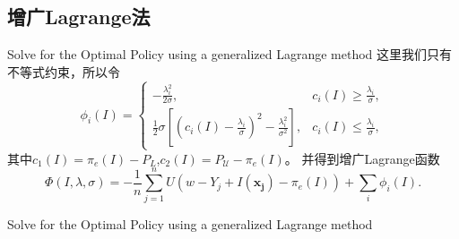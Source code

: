 \documentclass{beamer}
\begin{document}
\subsection{增广Lagrange法}
\begin{frame}{Solve for the Optimal Policy using a generalized Lagrange method}
这里我们只有不等式约束，所以令
\begin{equation}
\phi_i(I)=\begin{cases}
-\frac{\lambda_i^2}{2\sigma},&c_i(I)\geq \frac{\lambda_i}{\sigma},\\
\frac{1}{2}\sigma\left[\left(c_i(I) - \frac{\lambda_i}{\sigma}\right)^2-\frac{\lambda_i^2}{\sigma^2}\right],&c_i(I)\leq\frac{\lambda_i}{\sigma},
\end{cases}
\end{equation}
其中\(c_1(I)=\pi_e(I)-P_L\),\(c_2(I)=P_\mathcal{U}-\pi_e(I)\)。
并得到增广Lagrange函数
\[
\Phi(I,\lambda,\sigma)= -\frac{1}{n}\sum_{j=1}^n U(w-Y_j+I(\boldsymbol{x_j})-\pi_e(I))+\sum_i\phi_i(I).
\]
\end{frame}
\begin{frame}{Solve for the Optimal Policy using a generalized Lagrange method}
\end{frame}
\end{document}
